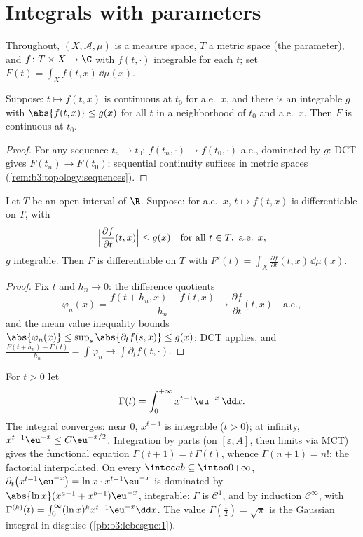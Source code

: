\section{Integrals with parameters}

Throughout, $(X, \mathcal A, \mu)$ is a measure space, $T$ a
metric space (the parameter), and $f \colon T \times X \to \C$
with $f(t, \cdot)$ integrable for each $t$; set $F(t) = \int_X
f(t, x)\,\dd\mu(x)$.

\begin{theorem}[Continuity]\label{thm:b3:lebesgue:paramcont}
Suppose: $t \mapsto f(t,x)$ is continuous at $t_0$ for a.e.\
$x$, and there is an integrable $g$ with $\abs{f(t,x)} \leq
g(x)$ for all $t$ in a neighborhood of $t_0$ and a.e.\ $x$.
Then $F$ is continuous at $t_0$.
\end{theorem}

\begin{proof}
For any sequence $t_n \to t_0$: $f(t_n, \cdot) \to f(t_0,
\cdot)$ a.e., dominated by $g$: DCT gives $F(t_n) \to F(t_0)$;
sequential continuity suffices in metric spaces
(\cref{rem:b3:topology:sequences}).
\end{proof}

\begin{theorem}
\label{thm:b3:lebesgue:paramdiff}
Let $T$ be an open interval of $\R$. Suppose: for a.e.\ $x$,
$t \mapsto f(t,x)$ is differentiable on $T$, with
\[
\Bigl|\frac{\partial f}{\partial t}(t, x)\Bigr| \leq g(x)
\quad \text{for all } t \in T,\ \text{a.e. } x,
\]
$g$ integrable. Then $F$ is differentiable on $T$ with $F'(t)
= \int_X \frac{\partial f}{\partial t}(t, x)\,\dd\mu(x)$.
\end{theorem}

\begin{proof}
Fix $t$ and $h_n \to 0$: the difference quotients
\[
\varphi_n(x) = \frac{f(t + h_n, x) - f(t, x)}{h_n}
\longrightarrow \frac{\partial f}{\partial t}(t,x)
\quad\text{a.e.},
\]
and the mean value inequality bounds $\abs{\varphi_n(x)} \leq
\sup_{s}\abs{\partial_tf(s,x)} \leq g(x)$: DCT applies, and
$\frac{F(t + h_n) - F(t)}{h_n} = \int\varphi_n \to
\int\partial_t f(t, \cdot)$.
\end{proof}

\begin{example}[The Gamma function]\label{ex:b3:lebesgue:gamma}
For $t > 0$ let
\[
\Gamma(t) = \int_0^{+\infty} x^{t-1}\eu^{-x}\,\dd x .
\]
The integral converges: near $0$, $x^{t-1}$ is integrable ($t >
0$); at infinity, $x^{t-1}\eu^{-x} \leq C\eu^{-x/2}$.
Integration by parts (on $[\varepsilon, A]$, then limits via
MCT) gives the functional equation $\Gamma(t + 1) =
t\,\Gamma(t)$, whence $\Gamma(n+1) = n!$: the factorial
interpolated. On every $\intcc ab \subseteq \intoo0{+\infty}$,
$\partial_t\bigl(x^{t-1}\eu^{-x}\bigr) = \ln
x\cdot x^{t-1}\eu^{-x}$ is dominated by $\abs{\ln x}(x^{a-1} +
x^{b-1})\eu^{-x}$, integrable: $\Gamma$ is $\mathcal C^1$, and
by induction $\mathcal C^\infty$, with $\Gamma^{(k)}(t) =
\int_0^\infty(\ln x)^kx^{t-1}\eu^{-x}\dd x$. The value
$\Gamma(\frac12) = \sqrt\pi$ is the Gaussian integral in
disguise (\cref{pb:b3:lebesgue:1}).
\end{example}

